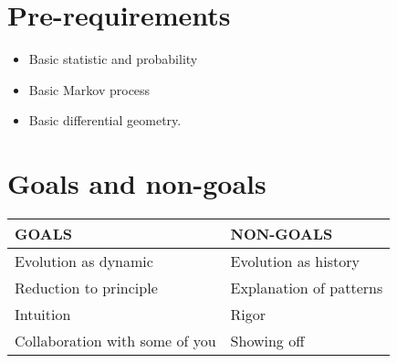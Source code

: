 
\chapter*{Pre-requirements}

\begin{itemize}
	\item Basic statistic and probability 
	\item  Basic Markov process 
	\item Basic differential geometry.
\end{itemize}
{\let\clearpage\relax 

\chapter*{Goals and non-goals} 
\hspace*{-1cm}
\large
\begin{tabular}{ |p{8cm}|p{7cm}|  }
	\hline
	\textbf{GOALS}&\textbf{NON-GOALS}\\
	\hline
	Evolution as dynamic&Evolution  as history\\
	Reduction to principle& Explanation of patterns \\
	Intuition & Rigor \\
	Collaboration with some of you& Showing off \\
	\hline
\end{tabular}

}






